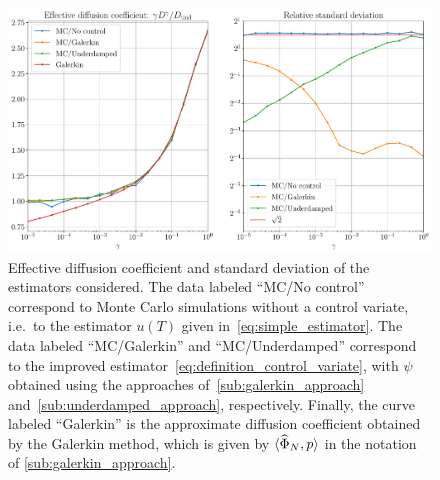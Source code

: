 \documentclass[11pt,a4paper]{article}
\theoremstyle{plain}
\numberwithin{equation}{section}
\begin{document}
\begin{figure}[ht]
    \centering
    \includegraphics[width=0.99\linewidth]{figures/underdamped_1d.pdf}
    \caption{
        Effective diffusion coefficient and standard deviation of the estimators considered.
        The data labeled ``MC/No control'' correspond to Monte Carlo simulations without a control variate,
        i.e.\ to the estimator $u(T)$ given in~\eqref{eq:simple_estimator}.
        The data labeled ``MC/Galerkin'' and ``MC/Underdamped'' correspond to the improved estimator~\eqref{eq:definition_control_variate},
        with $\psi$ obtained using the approaches of~\cref{sub:galerkin_approach} and~\cref{sub:underdamped_approach},
        respectively.
        Finally, the curve labeled ``Galerkin'' is the approximate diffusion coefficient obtained by the Galerkin method,
        which is given by $\ip*{\widehat \Phi_N}{p}$ in the notation of \cref{sub:galerkin_approach}.
    }%
    \label{fig:effective_diffusion_langevin}
\end{figure}
\end{document}

